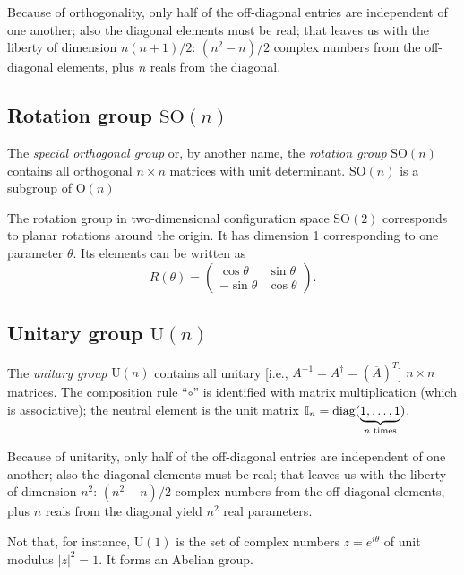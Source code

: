Because of orthogonality, only half of the off-diagonal entries are independent of one another; also
the diagonal elements must be real; that leaves us with the liberty of dimension $n(n+1)/2$:
$(n^2-n)/2$ complex numbers from the off-diagonal elements,
plus $n$ reals from the diagonal.

\subsection{Rotation group $\textrm{SO}(n)$}

The {\em special orthogonal group} or, by another name, the {\em rotation group} $\textrm{SO}(n)$
contains all  orthogonal
$n\times n$ matrices with unit determinant.
$\textrm{SO}(n)$ is a subgroup of $\textrm{O}(n)$

The rotation group in two-dimensional configuration space  $\textrm{SO}(2)$
corresponds to planar rotations around the origin. It has dimension 1 corresponding to one parameter $\theta$.
Its elements can be written as
\begin{equation}
R(\theta )  =
\begin{pmatrix}
\cos \theta & \sin \theta\\
- \sin \theta  & \cos \theta
\end{pmatrix}
.
\end{equation}


\subsection{Unitary group $\textrm{U}(n)$}

The {\em unitary group} $\textrm{U}(n)$
 \cite{murnaghan}
contains all  unitary [i.e., $  A  ^{-1}=  A  ^\dagger =(\overline{  A  })^T$]
$n\times n$ matrices.
The composition rule ``$\circ$''
is identified with matrix multiplication (which is associative); the neutral element is the unit
matrix ${\Bbb I}_n=\textrm{diag}(\underbrace{1,\ldots ,1}_{n \textrm{ times}})$.

Because of unitarity, only half of the off-diagonal entries are independent of one another; also
the diagonal elements must be real; that leaves us with the liberty of dimension $n^2$:
$(n^2-n)/2$ complex numbers from the off-diagonal elements,
plus $n$ reals from the diagonal yield $n^2$ real parameters.

Not that, for instance,
$\textrm{U}(1)$ is the set of complex numbers $z=e^{i\theta}$ of unit modulus  $|z|^2=1$. It  forms an Abelian group.

